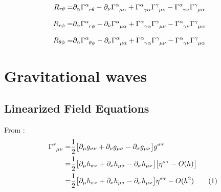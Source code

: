 \documentclass[]{article}
\newcommand\numberthis{\addtocounter{equation}{1}\tag{\theequation}}
\begin{document}
\begin{align*}
	R_{r\theta} =& \partial_\alpha \Gamma\indices{^\alpha_{r\theta}} - \partial_\nu \Gamma\indices{^\alpha_{\mu\alpha}} + \Gamma\indices{^\alpha_{\gamma\alpha}} \Gamma\indices{^\gamma_{\mu\nu}} - \Gamma\indices{^\alpha_{\gamma\nu}} \Gamma\indices{^\gamma_{\mu\alpha}}
\end{align*}

\begin{align*}
	R_{r\phi} =& \partial_\alpha \Gamma\indices{^\alpha_{r\phi}} - \partial_\nu \Gamma\indices{^\alpha_{\mu\alpha}} + \Gamma\indices{^\alpha_{\gamma\alpha}} \Gamma\indices{^\gamma_{\mu\nu}} - \Gamma\indices{^\alpha_{\gamma\nu}} \Gamma\indices{^\gamma_{\mu\alpha}}
\end{align*}

\begin{align*}
	R_{\theta\phi} =& \partial_\alpha \Gamma\indices{^\alpha_{\theta\phi}} - \partial_\nu \Gamma\indices{^\alpha_{\mu\alpha}} + \Gamma\indices{^\alpha_{\gamma\alpha}} \Gamma\indices{^\gamma_{\mu\nu}} - \Gamma\indices{^\alpha_{\gamma\nu}} \Gamma\indices{^\gamma_{\mu\alpha}}
\end{align*}

\section{Gravitational waves}

\subsection{Linearized Field Equations}

From \cite[Lecture 10]{susskind2012general}:
\begin{align*}
	\Gamma\indices{^{\tau}_{\mu\nu}} =&\frac{1}{2} \big[ \partial_\mu g_{\sigma\nu} + \partial_\nu g_{\mu\sigma} - \partial_\sigma g_{\mu\nu}\big] g^{\sigma\tau}\\
	=& \frac{1}{2} \big[ \partial_\mu h_{\sigma\nu} + \partial_\nu h_{\mu\sigma} - \partial_\sigma h_{\mu\nu}\big] \big[\eta^{\sigma\tau }- O(h)\big]\\
	=& \frac{1}{2} \big[ \partial_\mu h_{\sigma\nu} + \partial_\nu h_{\mu\sigma} - \partial_\sigma h_{\mu\nu}\big] \eta^{\sigma\tau }- O(h^2) \numberthis \label{eq:Gamma:small}
\end{align*}
\end{document}
